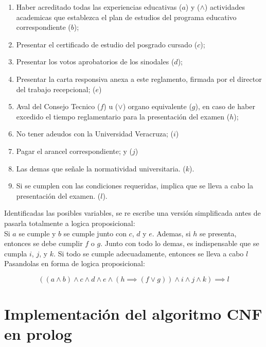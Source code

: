 \documentclass[11pt, letterpaper]{article}
\begin{document}
	\begin{enumerate}[I]
	\item Haber acreditado todas las experiencias educativas ($a$) y ($\wedge$) actividades academicas que establezca el plan de estudios del programa educativo correspondiente ($b$);
	
	\item Presentar el certificado de estudio del posgrado cursado ($c$);
	\item Presentar los votos aprobatorios de los sinodales ($d$);
	\item Presentar la carta responsiva anexa a este reglamento, firmada por el director del trabajo recepcional; ($e$)
	\item Aval del Consejo Tecnico ($f$) u ($\vee$) organo equivalente ($g$), en caso de haber excedido el tiempo reglamentario para la presentación del examen ($h$);
	\item No tener adeudos con la Universidad Veracruza; ($i$)
	\item Pagar el arancel correspondiente; y ($j$)
	\item Las demas que señale la normatividad universitaria. ($k$).
	\item Si se cumplen con las condiciones requeridas, implica que se lleva a cabo la presentación del examen. ($l$).
	\end{enumerate}

	Identificadas las posibles variables, se re escribe una versión simplificada antes de pasarla totalmente a logica proposicional: \\
	
	Si $a$ se cumple y $b$ se cumple junto con $c$, $d$ y $e$. Ademas, si $h$ se presenta, entonces se debe cumplir $f$ o $g$. Junto con todo lo demas, es indispensable que se cumpla $i$, $j$, y $k$. Si todo se cumple adecuadamente, entonces se lleva a cabo $l$ \\
	
	Pasandolas en forma de logica proposicional:
	
	$$((a \wedge b) \wedge c \wedge d \wedge e \wedge (h \implies (f \vee g)) \wedge i \wedge j \wedge k) \implies l$$
	
	
	
	
	
	
	
	
	
	
	
	
	
	
	\newpage
	
	\section{Implementación del algoritmo CNF en prolog}
	
\end{document}
